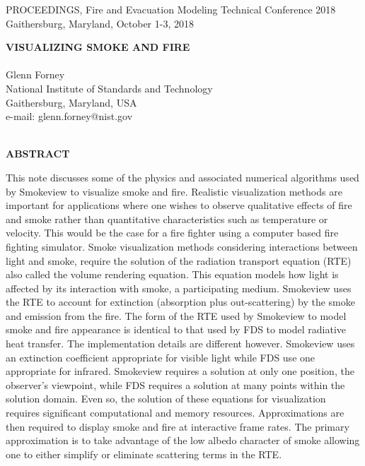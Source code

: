 \documentclass[11pt]{article}
\begin{document}



\pagestyle{plain}


\pagestyle{empty}
%
%

\newpage

PROCEEDINGS, Fire and Evacuation Modeling Technical Conference 2018 \\
Gaithersburg, Maryland, October 1-3, 2018

\begin{center}
{\bf VISUALIZING SMOKE AND FIRE} \\
\hspace{1in} \\
Glenn Forney \\
National Institute of Standards and Technology \\
Gaithersburg, Maryland, USA \\
e-mail: glenn.forney@nist.gov \\
\hspace{1in} \\
\end{center}
\begin{center}
{\bf ABSTRACT}\\
\end{center}

This note discusses some of the physics and associated numerical algorithms used by Smokeview to visualize smoke and fire. Realistic visualization methods are important for applications where one wishes to observe qualitative effects of fire and smoke rather than quantitative characteristics such as temperature or velocity. This would be the case for a fire fighter using a computer based fire fighting simulator.  Smoke visualization methods considering interactions between light and smoke, require the solution of the radiation transport equation (RTE) also called the volume rendering equation. This equation models how light is affected by its interaction with smoke, a participating medium. Smokeview uses the RTE to account for extinction (absorption plus out-scattering) by the smoke and emission from the fire. The form of the RTE used by Smokeview to model smoke and fire appearance is identical to that used by FDS to model radiative heat transfer.  The implementation details are different however.  Smokeview uses an extinction coefficient appropriate for visible light while FDS use one appropriate for infrared. Smokeview requires a solution at only one position, the observer's viewpoint, while FDS requires a solution at many points within the solution domain. Even so, the solution of these equations for visualization requires significant computational and memory resources.  Approximations are then required to display smoke and fire at interactive frame rates. The primary approximation is to take advantage of the low albedo character of smoke allowing one to either simplify or eliminate scattering terms in the RTE.
\end{document}
